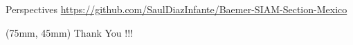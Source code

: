 \begin{frame}{Perspectives}
    \vspace*{5mm}
    \href{https://github.com/SaulDiazInfante/Baemer-SIAM-Section-Mexico}{%
    https://github.com/SaulDiazInfante/Baemer-SIAM-Section-Mexico
    }
    \begin{textblock*}{60mm}(75mm, 45mm)
        \Huge{Thank You !!!}
    \end{textblock*}
\end{frame}